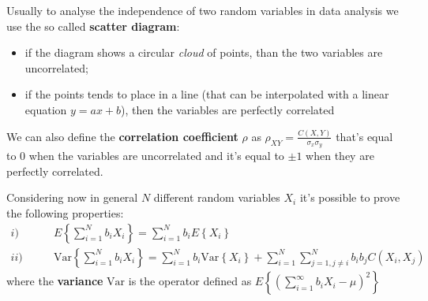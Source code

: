 	Usually to analyse the independence of two random variables in data analysis we use the so called \textbf{scatter diagram}:
	\begin{itemize}
		\item if the diagram shows a circular \textit{cloud} of points, than the two variables are uncorrelated;
		\item if the points tends to place in a line (that can be interpolated with a linear equation $y = ax + b$), then the variables are perfectly correlated 
	\end{itemize}
	We can also define the \textbf{correlation coefficient} $\rho$ as $\rho_{XY} = \frac{C(X,Y)}{\sigma_x \sigma_y}$ that's equal to 0 when the variables are uncorrelated and it's equal to $\pm 1$ when they are perfectly correlated.
	
	Considering now in general $N$ different random variables $X_i$ it's possible to prove the following properties:
	\begin{align*}
		i) & \qquad  E\left\{ \sum_{i=1}^N b_i X_i \right\} = \sum_{i=1}^N b_i E \left\{X_i\right\} \\
		ii)& \qquad \textrm{Var} \left\{ \sum_{i=1}^N b_i X_i \right\} = \sum_{i=1}^N b_i \textrm{Var} \left\{X_i\right\} + \sum_{i=1}^N\sum_{j=1,j\neq i}^N b_i b_j C(X_i,X_j) 
	\end{align*}
	where the \textbf{variance} $\textrm{Var}$ is the operator defined as $E\left\{\left(\sum_{i=1}^\infty b_i X_i - \mu \right)^2\right\}$
	
	
	
	
	
	
	
	
	
	
	
	
	
	
	
	
	
	
	
	
	
	
	
	
	
	
	
	
	
	
	
	
	
	